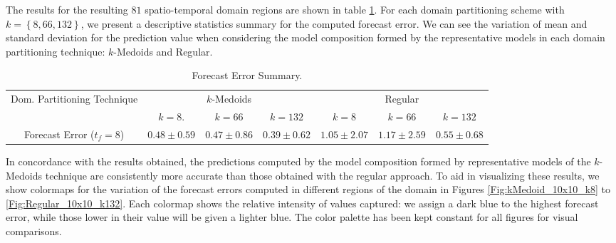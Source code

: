 The results for the resulting $81$ spatio-temporal domain regions are shown in table \ref{Table:Query10x10_kMedoids_Regular_StatSummary}. For each domain partitioning scheme with $k = \left\{8, 66, 132 \right\}$, we present a descriptive statistics summary for the computed forecast error. We can see the variation of mean and standard deviation for the prediction value when considering the model composition formed by the representative models in each domain partitioning technique: $k$-Medoids and Regular.

\begin{table}[h!]
	\centering
	\tiny
	\begin{tabular}{|c|c|c|c|c|c|c|}
		\hline
		\multirow{2}{*}{Dom. Partitioning Technique} & \multicolumn{3}{c|}{$k$-Medoids} & \multicolumn{3}{c|}{Regular} \\
		\cline{2-7}
		& $k = 8$. & $k = 66$ & $k = 132$ & $k = 8$ & $k = 66$ & $k = 132$ \\
		\cline{2-7}
		\hline
		Forecast Error ($t_{f}=8$) & $0.48 \pm 0.59$ & $0.47 \pm 0.86$ & $0.39 \pm 0.62$ & $1.05 \pm 2.07$ & $1.17 \pm 2.59$ & $0.55 \pm 0.68$	 \\
		\hline
	\end{tabular}
	\caption{Forecast Error Summary.}
	\label{Table:Query10x10_kMedoids_Regular_StatSummary}
\end{table}

In concordance with the results obtained, the predictions computed by the model composition formed by representative models of the $k$-Medoids technique are consistently more accurate than those obtained with the regular approach. To aid in visualizing these results, we show colormaps for the variation of the forecast errors computed in different regions of the domain in Figures \ref{Fig:kMedoid_10x10_k8} to \ref{Fig:Regular_10x10_k132}. Each colormap shows the relative intensity of values captured: we assign a dark blue to the highest forecast error, while those lower in their value will be given a lighter blue. The color palette has been kept constant for all figures for visual comparisons.

